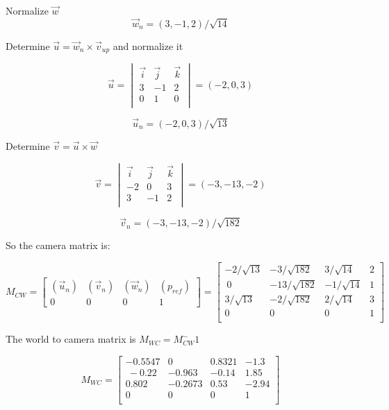 \documentclass[a4paper,10pt]{scrartcl}
\begin{document}
Normalize $\vec w $
\[ \vec w_n = (3, -1, 2)/\sqrt{14}\]

Determine $\vec u = \vec w_n \times \vec v_{up}$ and normalize it

\[ \vec u = \begin{vmatrix} \vec i &\vec j &\vec k \\
	      3 & -1 & 2 \\
	      0 & 1 & 0\\             
            \end{vmatrix} = (-2, 0, 3)
\]

\[ \vec u_n = (-2, 0, 3) / \sqrt{13}\]

Determine $\vec v = \vec u \times \vec w$

\[ \vec v = \begin{vmatrix} \vec i &\vec j &\vec k \\
	      -2 & 0 & 3\\             
	      3 & -1 & 2 \\	      
            \end{vmatrix} = (-3, -13, -2)\]
            
\[ \vec v_n = (-3, -13, -2) / \sqrt{182}\]


So the camera matrix is:

\[ M_{CW} = \begin{bmatrix}
	      (\vec u_n) & (\vec v_n) & (\vec w_n) & (p_{ref}) \\
	      0 & 0 & 0 & 1
            \end{bmatrix} = 
            \begin{bmatrix}
	      -2/\sqrt{13} & -3/\sqrt{182} & 3/\sqrt{14} & 2 \\\
	      0 & -13/\sqrt{182} & -1/\sqrt{14} & 1 \\
	      3/\sqrt{13} & -2/\sqrt{182} & 2/\sqrt{14} & 3 \\
	      0 & 0 & 0 & 1\\
            \end{bmatrix}            
\]

The world to camera matrix is $M_{WC} = M_{CW}^-1$

\[ M_{WC} =    \begin{bmatrix}
	      -0.5547 & 0 & 0.8321 & -1.3 \\\
	      -0.22 & -0.963 & -0.14 & 1.85 \\
	      0.802 & -0.2673 & 0.53 & -2.94 \\
	      0 & 0 & 0 & 1\\
            \end{bmatrix}\]
\end{document}
